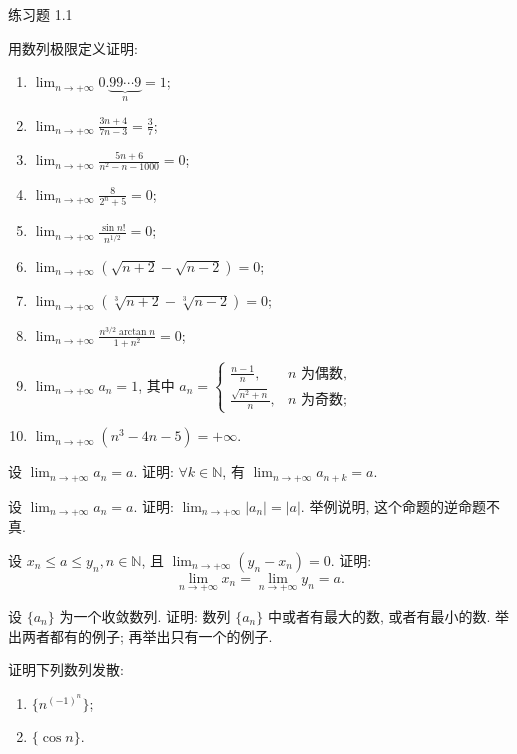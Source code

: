 \begin{exblock}{练习题 1.1}
\item 用数列极限定义证明:
\begin{enumerate}
  \item $\lim_{n \to +\infty} 0.\underbrace{99 \cdots 9}_n = 1$;
  \item $\lim_{n \to +\infty} \frac{3n + 4}{7n - 3} = \frac{3}{7}$;
  \item $\lim_{n \to +\infty} \frac{5n + 6}{n^2 - n - 1000} = 0$;
  \item $\lim_{n \to +\infty} \frac{8}{2^n + 5} = 0$;
  \item $\lim_{n \to +\infty} \frac{\sin n!}{n^{1/2}} = 0$;
  \item $\lim_{n \to +\infty} (\sqrt{n + 2} - \sqrt{n - 2}) = 0$;
  \item $\lim_{n \to +\infty} (\sqrt[3]{n+2} - \sqrt[3]{n-2}) = 0$;
  \item $\lim_{n \to +\infty} \frac{n^{3/2} \arctan n}{1 + n^2} = 0$;
  \item $\lim_{n \to +\infty} a_n = 1$, 其中 $a_n = \begin{cases} \frac{n-1}{n}, & n \text{ 为偶数}, \\ \frac{\sqrt{n^2 + n}}{n}, & n \text{ 为奇数}; \end{cases}$
  \item $\lim_{n \to +\infty} (n^3 - 4n - 5) = +\infty$.
\end{enumerate}

\item 设 $\lim_{n\to+\infty}a_n=a$. 证明: $\forall k\in\mathbb{N}$, 有 $\lim_{n\to+\infty}a_{n+k}=a$.

\item 设 $\lim_{n\to+\infty}a_n=a$. 证明: $\lim_{n\to+\infty}|a_n|=|a|$. 举例说明, 这个命题的逆命题不真.

\item 设 $x_{n} \leqslant a \leqslant y_{n}, n \in \mathbb{N}$, 且 $\lim_{n\to+\infty}(y_{n}-x_{n})=0$. 证明:
\[
  \lim_{n\to+\infty}x_{n}=\lim_{n\to+\infty}y_{n}=a.
\]

\item 设 $\{a_{n}\}$ 为一个收敛数列. 证明: 数列 $\{a_{n}\}$ 中或者有最大的数, 或者有最小的数. 举出两者都有的例子; 再举出只有一个的例子.

\item 证明下列数列发散:
\begin{enumerate}
  \item $\{n^{(-1)^n}\}$;
  \item $\{\cos n\}$.
\end{enumerate}


\end{exblock}
